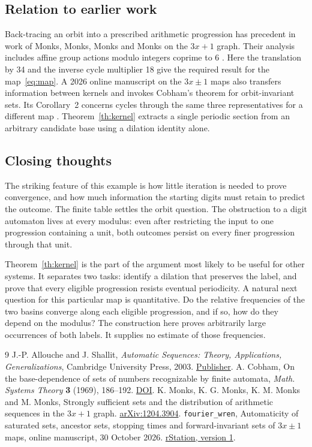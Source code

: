 \documentclass[11pt,a4paper]{article}
\begin{document}
\subsection*{Relation to earlier work}
Back-tracing an orbit into a prescribed arithmetic progression has precedent in work of Monks, Monks, Monks and Monks on the $3x+1$ graph. Their analysis includes affine group actions modulo integers coprime to 6 \cite{Monks}. Here the translation by 34 and the inverse cycle multiplier 18 give the required result for the map~\eqref{eq:map}. A 2026 online manuscript on the $3x\mathbin{\pm}1$ maps also transfers information between kernels and invokes Cobham's theorem for orbit-invariant sets. Its Corollary~2 concerns cycles through the same three representatives for a different map \cite{Wren}. Theorem~\ref{th:kernel} extracts a single periodic section from an arbitrary candidate base using a dilation identity alone.

\subsection*{Closing thoughts}
The striking feature of this example is how little iteration is needed to prove convergence, and how much information the starting digits must retain to predict the outcome. The finite table settles the orbit question. The obstruction to a digit automaton lives at every modulus: even after restricting the input to one progression containing a unit, both outcomes persist on every finer progression through that unit.

Theorem~\ref{th:kernel} is the part of the argument most likely to be useful for other systems. It separates two tasks: identify a dilation that preserves the label, and prove that every eligible progression resists eventual periodicity. A natural next question for this particular map is quantitative. Do the relative frequencies of the two basins converge along each eligible progression, and if so, how do they depend on the modulus? The construction here proves arbitrarily large occurrences of both labels. It supplies no estimate of those frequencies.

\begin{thebibliography}{9}\small
{} J.-P. Allouche and J. Shallit, \emph{Automatic Sequences: Theory, Applications, Generalizations}, Cambridge University Press, 2003. \href{https://doi.org/10.1017/CBO9780511546563}{Publisher}.
 A. Cobham, On the base-dependence of sets of numbers recognizable by finite automata, \emph{Math. Systems Theory} \textbf{3} (1969), 186--192. \href{https://doi.org/10.1007/BF01746527}{DOI}.
 K. Monks, K. G. Monks, K. M. Monks and M. Monks, Strongly sufficient sets and the distribution of arithmetic sequences in the $3x+1$ graph. \href{https://arxiv.org/abs/1204.3904}{arXiv:1204.3904}.
 \texttt{fourier\_wren}, Automaticity of saturated sets, ancestor sets, stopping times and forward-invariant sets of $3x\mathbin{\pm}1$ maps, online manuscript, 30 October 2026. \href{https://rstation.ai/problems/collatz/papers/64/v1}{rStation, version 1}.
\end{thebibliography}
\end{document}
